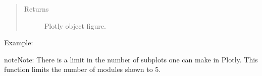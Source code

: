 \documentclass[letterpaper,10pt,english]{sphinxmanual}
\begin{document}
\begin{fulllineitems}
\begin{quote}
\begin{description}
\begin{itemize}
\end{itemize}

\item[{Returns}] \leavevmode
Plotly object figure.

\end{description}\end{quote}

Example:

\begin{sphinxVerbatim}[commandchars=\\\{\}]
       
\end{sphinxVerbatim}

\begin{sphinxadmonition}{note}{Note:}
There is a limit in the number of subplots one can make in Plotly. This function limits the number of modules shown to 5.
\end{sphinxadmonition}

\end{fulllineitems}

\end{document}
